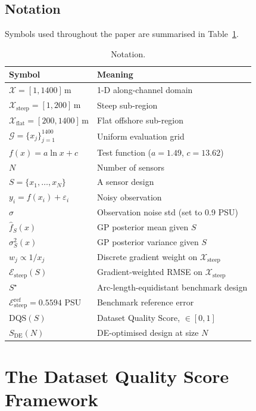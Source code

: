 \documentclass[11pt,letterpaper]{article}
\begin{document}
\subsection{Notation}
\label{sec:notation}
Symbols used throughout the paper are summarised in
Table~\ref{tab:notation}.

\begin{table}[H]
\centering
\caption{Notation.}
\label{tab:notation}
\small
\begin{tabular}{@{}ll@{}}
\toprule
Symbol & Meaning \\
\midrule
$\mathcal{X}=[1,1400]$\,m & 1-D along-channel domain \\
$\mathcal{X}_{\text{steep}}=[1,200]$\,m & Steep sub-region \\
$\mathcal{X}_{\text{flat}}=[200,1400]$\,m & Flat offshore sub-region \\
$\mathcal{G}=\{x_{j}\}_{j=1}^{1400}$ & Uniform evaluation grid \\
$f(x)=a\ln x + c$ & Test function ($a{=}1.49$, $c{=}13.62$) \\
$N$ & Number of sensors \\
$S=\{x_{1},\dots,x_{N}\}$ & A sensor design \\
$y_{i}=f(x_{i})+\varepsilon_{i}$ & Noisy observation \\
$\sigma$ & Observation noise std (set to 0.9 PSU) \\
$\hat f_{S}(x)$ & GP posterior mean given $S$ \\
$\sigma^{2}_{S}(x)$ & GP posterior variance given $S$ \\
$w_{j}\propto 1/x_{j}$ & Discrete gradient weight on $\mathcal{X}_{\text{steep}}$ \\
$\mathcal{E}_{\text{steep}}(S)$ & Gradient-weighted RMSE on $\mathcal{X}_{\text{steep}}$ \\
$S^{\star}$ & Arc-length-equidistant benchmark design \\
$\mathcal{E}_{\text{steep}}^{\text{ref}}=0.5594$ PSU
                                   & Benchmark reference error \\
$\mathrm{DQS}(S)$ & Dataset Quality Score, $\in[0,1]$ \\
$S_{\mathrm{DE}}(N)$ & DE-optimised design at size $N$ \\
\bottomrule
\end{tabular}
\end{table}

\section{The Dataset Quality Score Framework}
\label{sec:dqs-framework}
\end{document}
